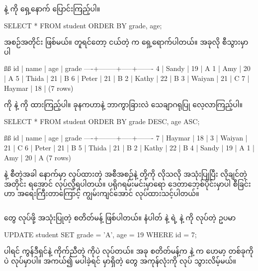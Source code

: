 နဲ့  ကို ရှေ့‌နောက် ပြောင်းကြည့်ပါ။ 
%
\begin{sql}
SELECT * FROM student ORDER BY grade, age;
\end{sql}
%
  အစဉ်အတိုင်း ဖြစ်မယ်။  တူရင်တော့  ငယ်တဲ့  က ရှေ့ရောက်ပါတယ်။ အခုလို စီသွားမှာပါ
%
\begin{vbtm}
ßß
 id |  name  | age | grade
----+--------+-----+-------
  4 | Sandy  |  19 | A
  1 | Amy    |  20 | A
  5 | Thida  |  21 | B
  6 | Peter  |  21 | B
  2 | Kathy  |  22 | B
  3 | Waiyan |  21 | C
  7 | Haymar |  18 |
(7 rows)
\end{vbtm}
%

 ကို  နဲ့  ကို  ထားကြည့်ပါ။ ခုနကဟာနဲ့ ဘာကွာခြားလဲ သေချာဂရုပြု လေ့လာကြည့်ပါ။
%
\begin{sql}
SELECT * FROM student ORDER BY grade DESC, age ASC;
\end{sql}
%
\begin{vbtm}
ßß
 id |  name  | age | grade
----+--------+-----+-------
  7 | Haymar |  18 |
  3 | Waiyan |  21 | C
  6 | Peter  |  21 | B
  5 | Thida  |  21 | B
  2 | Kathy  |  22 | B
  4 | Sandy  |  19 | A
  1 | Amy    |  20 | A
(7 rows)
\end{vbtm}

 နဲ့ စီတဲ့အခါ  နောက်မှာ  လုပ်ထားတဲ့  အစီအစဉ်နဲ့ \fEn{,}  တို့ကို လိုသလို အသုံးပြုပြီး လိုချင်တဲ့အတိုင်း ရအောင်  လုပ်လို့ရပါတယ်။ ပရိုဂရမ်းမင်းမှာရော ဒေတာဘေ့စ်ပိုင်းမှာပါ  စီခြင်းဟာ အရေးကြီးတာကြောင့် ကျွမ်းကျင်အောင် လုပ်ထားသင့်ပါတယ်။


\subsection*{}
 တွေ  လုပ်ဖို့ အသုံးပြုတဲ့  စတိတ်မန့် ဖြစ်ပါတယ်။  နံပါတ်  နဲ့  ရဲ့  နဲ့  ကို  လုပ်တဲ့ ဥပမာ
%
\begin{sql}
UPDATE student SET grade = 'A', age = 19 WHERE id = 7;
\end{sql}
%
 ပါရင်  ကွန်ဒီရှင်နဲ့ ကိုက်ညီတဲ့  ကိုပဲ  လုပ်တယ်။ အခု  စတိတ်မန့်က   နဲ့ က ဟေမာ့  တစ်ခုကိုပဲ  လုပ်မှာပါ။ အကယ်၍  မပါခဲ့ရင်  မှာရှိတဲ့  တွေ အကုန်လုံးကို  လုပ် သွားလိမ့်မယ်။

